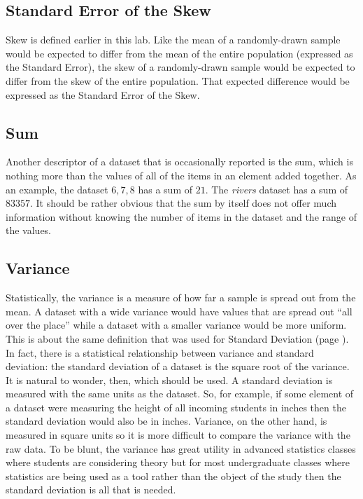 \subsection{Standard Error of the Skew}\label{lab03_standard_error_of_the_skew}

Skew is defined earlier in this lab. Like the mean of a randomly-drawn sample would be expected to differ from the mean of the entire population (expressed as the Standard Error), the skew of a randomly-drawn sample would be expected to differ from the skew of the entire population. That expected difference would be expressed as the Standard Error of the Skew.

\subsection{Sum}\label{lab03_sum}

Another descriptor of a dataset that is occasionally reported is the sum, which is nothing more than the values of all of the items in an element added together. As an example, the dataset $ 6, 7, 8 $ has a sum of $ 21 $. The \textit{rivers} dataset has a sum of $ 83357 $. It should be rather obvious that the sum by itself does not offer much information without knowing the number of items in the dataset and the range of the values.

\subsection{Variance}\label{lab03_variance}

Statistically, the variance is a measure of how far a sample is spread out from the mean. A dataset with a wide variance would have values that are spread out ``all over the place'' while a dataset with a smaller variance would be more uniform. This is about the same definition that was used for Standard Deviation (page \pageref{lab03_standard_deviation}). In fact, there is a statistical relationship between variance and standard deviation: the standard deviation of a dataset is the square root of the variance. It is natural to wonder, then, which should be used. A standard deviation is measured with the same units as the dataset. So, for example, if some element of a dataset were measuring the height of all incoming students in inches then the standard deviation would also be in inches. Variance, on the other hand, is measured in square units so it is more difficult to compare the variance with the raw data. To be blunt, the variance has great utility in advanced statistics classes where students are considering theory but for most undergraduate classes where statistics are being used as a tool rather than the object of the study then the standard deviation is all that is needed.

